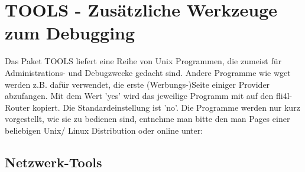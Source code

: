 {
\section{TOOLS - Zusätzliche Werkzeuge zum Debugging}
}

    Das Paket TOOLS liefert eine Reihe von Unix Programmen, die zumeist für
    Administrations- und Debugzwecke gedacht sind. Andere Programme wie wget
    werden z.B. dafür verwendet, die erste (Werbungs-)Seite einiger Provider
    abzufangen. Mit dem Wert 'yes' wird das jeweilige Programm mit auf den
    fli4l-Router kopiert. Die Standardeinstellung ist 'no'. Die Programme werden
    nur kurz vorgestellt, wie sie zu bedienen sind, entnehme man bitte den man
    Pages einer beliebigen Unix/ Linux Distribution oder online unter:

\subsection{Netzwerk-Tools}

